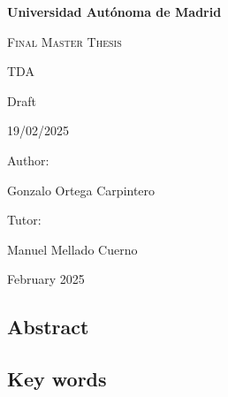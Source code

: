 \documentclass[12pt, a4paper]{article}
\theoremstyle{definition}
\newcommand{\authorname}{Gonzalo Ortega Carpintero}
\newcommand{\tutorname}{Manuel Mellado Cuerno}
\newcommand{\institution}{Universidad Autónoma de Madrid}
\newcommand{\projecttitle}{TDA

Draft

19/02/2025}
\begin{document}
\begin{titlepage}
    \centering
    \vspace{1cm}
    {\bfseries\LARGE \institution \par}
    \vspace{1cm}
    {\scshape\Large Final Master Thesis \par}
    \vspace{3cm}
    {\scshape\Huge \projecttitle \par}
    \vspace{2cm}
    \vfill
    {\Large Author: \par}
    {\Large \authorname \par}
    \vspace{1cm}
    {\Large Tutor: \par}
    {\Large \tutorname \par}
    \vfill
    {\Large February 2025 \par}
\end{titlepage}


\setlength{\parskip}{0.75em}
\renewcommand{\baselinestretch}{1.25}


\subsection*{Abstract}

\subsection*{Key words}

\tableofcontents
\pagebreak


\pagebreak



\end{document}
